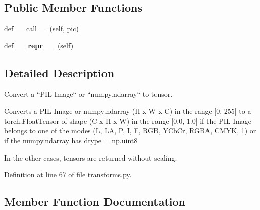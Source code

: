 \subsection*{Public Member Functions}
\begin{DoxyCompactItemize}
\item 
def \hyperlink{classtorchvision_1_1transforms_1_1transforms_1_1ToTensor_aca829308e5c716e3599051f42b3030c1}{\+\_\+\+\_\+call\+\_\+\+\_\+} (self, pic)
\item 
\mbox{\label{classtorchvision_1_1transforms_1_1transforms_1_1ToTensor_ae968314ac712cc35fbdb62cfe320f0b5}} 
def {\bfseries \+\_\+\+\_\+repr\+\_\+\+\_\+} (self)
\end{DoxyCompactItemize}


\subsection{Detailed Description}
\begin{DoxyVerb}Convert a ``PIL Image`` or ``numpy.ndarray`` to tensor.

Converts a PIL Image or numpy.ndarray (H x W x C) in the range
[0, 255] to a torch.FloatTensor of shape (C x H x W) in the range [0.0, 1.0]
if the PIL Image belongs to one of the modes (L, LA, P, I, F, RGB, YCbCr, RGBA, CMYK, 1)
or if the numpy.ndarray has dtype = np.uint8

In the other cases, tensors are returned without scaling.
\end{DoxyVerb}
 

Definition at line 67 of file transforms.\+py.



\subsection{Member Function Documentation}
\mbox{\label{classtorchvision_1_1transforms_1_1transforms_1_1ToTensor_aca829308e5c716e3599051f42b3030c1}} 
